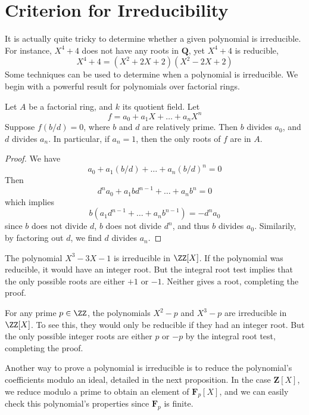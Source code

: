 \section{Criterion for Irreducibility}

It is actually quite tricky to determine whether a given polynomial is irreducible. For instance, $X^4 + 4$ does not have any roots in $\mathbf{Q}$, yet $X^4 + 4$ is reducible,
%
\[ X^4 + 4 = (X^2 + 2X + 2)(X^2 - 2X + 2) \]
%
Some techniques can be used to determine when a polynomial is irreducible. We begin with a powerful result for polynomials over factorial rings.

\begin{theorem}
    Let $A$ be a factorial ring, and $k$ its quotient field. Let
    \[ f = a_0 + a_1 X + \dots + a_n X^n \]
    Suppose $f(b/d) = 0$, where $b$ and $d$ are relatively prime. Then $b$ divides $a_0$, and $d$ divides $a_n$. In particular, if $a_n = 1$, then the only roots of $f$ are in $A$.
\end{theorem}
\begin{proof}
    We have
    \[ a_0 + a_1 (b/d) + \dots + a_n (b/d)^n = 0 \]
    Then
    \[ d^n a_0 + a_1 b d^{n-1} + \dots + a_n b^n = 0 \]
    which implies
    \[ b(a_1 d^{n-1} + \dots + a_n b^{n-1}) = -d^n a_0 \]
    since $b$ does not divide $d$, $b$ does not divide $d^n$, and thus $b$ divides $a_0$. Similarily, by factoring out $d$, we find $d$ divides $a_n$.
\end{proof}

\begin{example}
    The polynomial $X^3 - 3X - 1$ is irreducible in $\ZZ[X]$. If the polynomial was reducible, it would have an integer root. But the integral root test implies that the only possible roots are either $+1$ or $-1$. Neither gives a root, completing the proof.
\end{example}

\begin{example}
    For any prime $p \in \ZZ$, the polynomials $X^2 - p$ and $X^3 - p$ are irreducible in $\ZZ[X]$. To see this, they would only be reducible if they had an integer root. But the only possible integer roots are either $p$ or $-p$ by the integral root test, completing the proof.
\end{example}

Another way to prove a polynomial is irreducible is to reduce the polynomial's coefficients modulo an ideal, detailed in the next proposition. In the case $\mathbf{Z}[X]$, we reduce modulo a prime to obtain an element of $\mathbf{F}_p[X]$, and we can easily check this polynomial's properties since $\mathbf{F}_p$ is finite.

